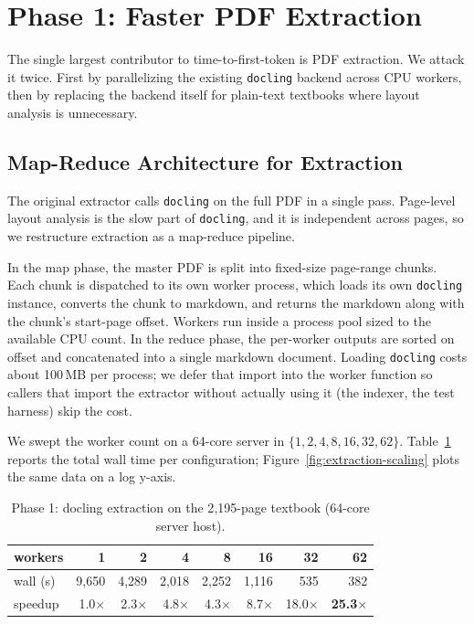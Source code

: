 \documentclass[sigconf]{acmart}
\begin{document}
\section{Phase 1: Faster PDF Extraction}

The single largest contributor to time-to-first-token is PDF
extraction. We attack it twice. First by parallelizing the existing
\texttt{docling} backend across CPU workers, then by replacing the
backend itself for plain-text textbooks where layout analysis is
unnecessary.

\subsection{Map-Reduce Architecture for Extraction}

The original extractor calls \texttt{docling} on the full PDF in a
single pass. Page-level layout analysis is the slow part of
\texttt{docling}, and it is independent across pages, so we restructure
extraction as a map-reduce pipeline.

In the map phase, the master PDF is split into fixed-size page-range
chunks. Each chunk is dispatched to its own worker process, which
loads its own \texttt{docling} instance, converts the chunk to
markdown, and returns the markdown along with the chunk's start-page
offset. Workers run inside a process pool sized to the available CPU
count. In the reduce phase, the per-worker outputs are sorted on
offset and concatenated into a single markdown document. Loading
\texttt{docling} costs about 100\,MB per process; we defer that import
into the worker function so callers that import the extractor without
actually using it (the indexer, the test harness) skip the cost.

We swept the worker count on a 64-core server in
$\{1, 2, 4, 8, 16, 32, 62\}$. Table~\ref{tab:phase1} reports the
total wall time per configuration; Figure~\ref{fig:extraction-scaling}
plots the same data on a log y-axis.

\begin{table}[h]
\caption{Phase 1: docling extraction on the 2{,}195-page textbook
(64-core server host).}
\label{tab:phase1}
\begin{tabular}{lrrrrrrr}
\toprule
workers   & 1       & 2       & 4       & 8       & 16      & 32      & 62 \\
\midrule
wall (s)  & 9{,}650 & 4{,}289 & 2{,}018 & 2{,}252 & 1{,}116 & 535     & 382 \\
speedup   & 1.0$\times$ & 2.3$\times$ & 4.8$\times$ & 4.3$\times$ & 8.7$\times$ & 18.0$\times$ & \textbf{25.3$\times$} \\
\bottomrule
\end{tabular}
\end{table}
\end{document}
